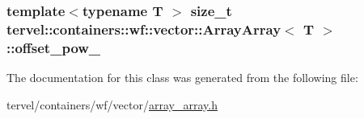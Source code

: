\subsubsection[{offset\+\_\+pow\+\_\+}]{\setlength{\rightskip}{0pt plus 5cm}template$<$typename T $>$ size\+\_\+t {\bf tervel\+::containers\+::wf\+::vector\+::\+Array\+Array}$<$ T $>$\+::offset\+\_\+pow\+\_\+\hspace{0.3cm}{\ttfamily [private]}}\label{classtervel_1_1containers_1_1wf_1_1vector_1_1_array_array_a914f36d1acd29dcda33665e08af09bca}


The documentation for this class was generated from the following file\+:\begin{DoxyCompactItemize}
\item 
tervel/containers/wf/vector/\hyperlink{array__array_8h}{array\+\_\+array.\+h}\end{DoxyCompactItemize}
